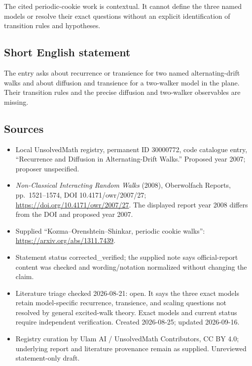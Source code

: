\documentclass[11pt]{article}
\begin{document}
The cited periodic-cookie work is contextual. It cannot define the three named models or resolve their exact questions without an explicit identification of transition rules and hypotheses.
\subsection{Short English statement}
The entry asks about recurrence or transience for two named alternating-drift walks and about diffusion and transience for a two-walker model in the plane. Their transition rules and the precise diffusion and two-walker observables are missing.
\subsection{Sources}
\begin{itemize}
\item Local UnsolvedMath registry, permanent ID 30000772, code catalogue entry, ``Recurrence and Diffusion in Alternating-Drift Walks.'' Proposed year 2007; proposer unspecified.
\item \emph{Non-Classical Interacting Random Walks} (2008), Oberwolfach Reports, pp.\ 1521--1574, DOI 10.4171/owr/2007/27; \url{https://doi.org/10.4171/owr/2007/27}. The displayed report year 2008 differs from the DOI and proposed year 2007.
\item Supplied ``Kozma--Orenshtein--Shinkar, periodic cookie walks'': \url{https://arxiv.org/abs/1311.7439}.
\item Statement status corrected\_verified; the supplied note says official-report content was checked and wording/notation normalized without changing the claim.
\item Literature triage checked 2026-08-21: open. It says the three exact models retain model-specific recurrence, transience, and scaling questions not resolved by general excited-walk theory. Exact models and current status require independent verification. Created 2026-08-25; updated 2026-09-16.
\item Registry curation by Ulam AI / UnsolvedMath Contributors, CC BY 4.0; underlying report and literature provenance remain as supplied. Unreviewed statement-only draft.
\end{itemize}
\end{document}
